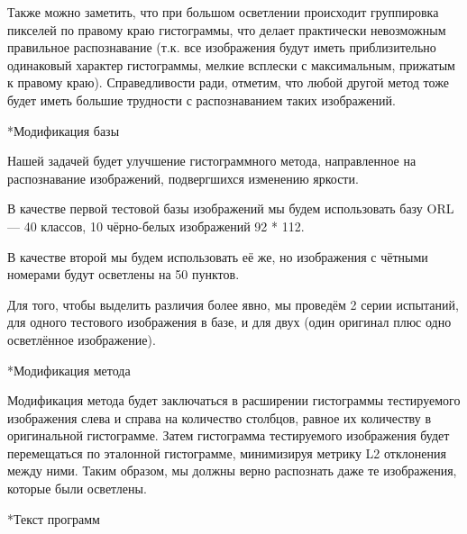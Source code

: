 \documentclass[a4paper,12pt,titlpage]{posobie}
\makeatletter
\renewcommand{\section}{\@startsection{section}{1}{0.0cm}{0.5cm}{0.1cm}%
             {\fontsize{16}{16}\bf\selectfont }}
\renewcommand{\subsection}{\@startsection{subsection}{2}{0.0cm}{0.3cm}{0.1cm}%
             {\fontsize{14}{16}\bf\selectfont }}
\makeatother
\begin{document}
Также можно заметить, что при большом осветлении происходит группировка пикселей по правому краю гистограммы, 
что делает практически невозможным правильное распознавание (т.к. все изображения будут иметь приблизительно 
одинаковый характер гистограммы, мелкие всплески с максимальным, прижатым к правому краю). Справедливости ради, 
отметим, что любой другой метод тоже будет иметь большие трудности с распознаванием таких изображений. 

\subsection*{Модификация базы}

Нашей задачей будет улучшение гистограммного метода, направленное на распознавание изображений, подвергшихся изменению яркости. 

В качестве первой тестовой базы изображений мы будем использовать базу ORL — 40 классов, 10 чёрно-белых изображений 92 * 112.

В качестве второй мы будем использовать её же, но изображения с чётными номерами будут осветлены на 50 пунктов.

Для того, чтобы выделить различия более явно, мы проведём 2 серии испытаний, для одного тестового изображения в базе, 
и для двух (один оригинал плюс одно осветлённое изображение).

\subsection*{Модификация метода}

Модификация метода будет заключаться в расширении гистограммы тестируемого изображения слева и справа на количество 
столбцов, равное их количеству в оригинальной гистограмме. Затем гистограмма тестируемого изображения будет 
перемещаться по эталонной гистограмме, минимизируя метрику L2 отклонения между ними. Таким образом, мы должны 
верно распознать даже те изображения, которые были осветлены.

\section*{Текст программ}







\end{document}
